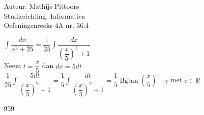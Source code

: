 \documentclass[a4paper]{article}
\newcommand{\intt}{\displaystyle\int}
\begin{document}
  
\noindent \large Auteur: Mathijs Pittoors \\
\noindent \large Studierichting: Informatica\\
\noindent \large Oefeningenreeks 4A nr. 36.4\\

\medskip

\normalsize

$\intt \dfrac{dx}{x^2 + 25} = \dfrac{1}{25} \intt \dfrac{dx}{\left(\dfrac{x}{5}\right)^2 + 1}$\\

Neem $t = \dfrac{x}{5}$ dan $dx = 5dt$\\

$\dfrac{1}{25} \intt \dfrac{5dt}{\left(\dfrac{x}{5}\right)^2 + 1} = \dfrac{1}{5} \intt \dfrac{dt}{\left(\dfrac{x}{5}\right)^2 + 1} = \dfrac{1}{5}\operatorname{Bgtan}\left(\dfrac{x}{5}\right) + c$ met $c \in \mathbb{R}$\\

\begin{thebibliography}{999}
\end{thebibliography}
\end{document}
